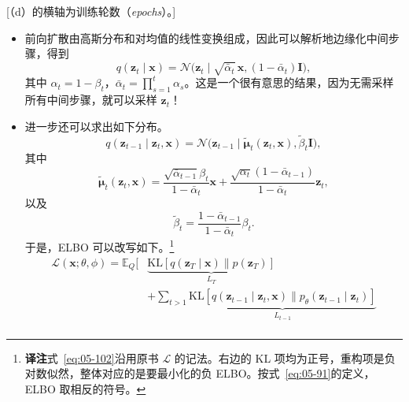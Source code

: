 [（d）的横轴为训练轮数（\textit{epochs}）。]

\begin{itemize}
\item 前向扩散由高斯分布和对均值的线性变换组成，因此可以解析地边缘化中间步骤，得到
\begin{equation}
q(\mathbf{z}_t\mid\mathbf{x})=\mathcal{N}\bigl(\mathbf{z}_t\mid\sqrt{\bar\alpha_t}\,\mathbf{x},(1-\bar\alpha_t)\mathbf{I}\bigr),
\tag{5.98}\label{eq:05-98}
\end{equation}
其中 $\alpha_t=1-\beta_t$，$\bar\alpha_t=\prod_{s=1}^t\alpha_s$。这是一个很有意思的结果，因为无需采样所有中间步骤，就可以采样 $\mathbf{z}_t$！
\item 进一步还可以求出如下分布。
\begin{equation}
q(\mathbf{z}_{t-1}\mid\mathbf{z}_t,\mathbf{x})
 =\mathcal{N}\bigl(\mathbf{z}_{t-1}\mid\tilde{\boldsymbol{\mu}}_t(\mathbf{z}_t,\mathbf{x}),\tilde\beta_t\mathbf{I}\bigr),
\tag{5.99}\label{eq:05-99}
\end{equation}
其中
\begin{equation}
\tilde{\boldsymbol{\mu}}_t(\mathbf{z}_t,\mathbf{x})
 =\frac{\sqrt{\bar\alpha_{t-1}}\beta_t}{1-\bar\alpha_t}\mathbf{x}
  +\frac{\sqrt{\alpha_t}(1-\bar\alpha_{t-1})}{1-\bar\alpha_t}\mathbf{z}_t,
\tag{5.100}\label{eq:05-100}
\end{equation}
以及
\begin{equation}
\tilde\beta_t=\frac{1-\bar\alpha_{t-1}}{1-\bar\alpha_t}\beta_t.
\tag{5.101}\label{eq:05-101}
\end{equation}
于是，ELBO 可以改写如下。\footnote{\textbf{译注}\quad 式~\eqref{eq:05-102}沿用原书 $\mathcal{L}$ 的记法。右边的 KL 项均为正号，重构项是负对数似然，整体对应的是要最小化的负 ELBO。按式~\eqref{eq:05-91}的定义，ELBO 取相反的符号。}
\begin{equation}
\begin{aligned}
\mathcal{L}(\mathbf{x};\theta,\phi)
 =\mathbb{E}_Q\Biggl[&
 \underbrace{\mathrm{KL}[q(\mathbf{z}_T\mid\mathbf{x})\|p(\mathbf{z}_T)]}_{L_T}\\
 &+\sum_{t>1}\underbrace{\mathrm{KL}[q(\mathbf{z}_{t-1}\mid\mathbf{z}_t,\mathbf{x})
                                   \|p_\theta(\mathbf{z}_{t-1}\mid\mathbf{z}_t)]}_{L_{t-1}}\\

\end{aligned}
\end{equation}
\end{itemize}
